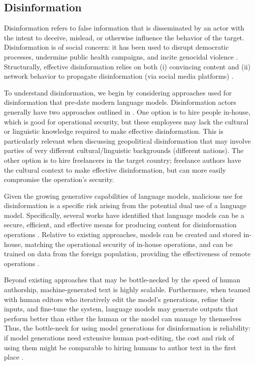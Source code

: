 \hypertarget{disinformation}{\subsection{Disinformation}}
Disinformation refers to false information that is disseminated by an actor with the intent to deceive, mislead, or otherwise influence the behavior of the target.
Disinformation is of social concern: it has been used to disrupt democratic processes, undermine public health campaigns, and incite genocidal violence \citep{election2021long, zarocostas2020fight, whitten2020poison}. 
Structurally, effective disinformation relies on both (i) convincing content and (ii) network behavior to propagate disinformation (\eg via social media platforms) \citep{benkler2018network}. 

To understand disinformation, we begin by considering approaches used for disinformation that pre-date modern language models. 
Disinformation actors generally have two approaches outlined in \citet{diresta2022house}.
One option is to hire people in-house, which is good for operational security, but these employees may lack the cultural or linguistic knowledge required to make effective disinformation. 
This is particularly relevant when discussing geopolitical disinformation that may involve parties of very different cultural/linguistic backgrounds (\eg different nations). 
The other option is to hire freelancers in the target country; freelance authors have the cultural context to make effective disinformation, but can more easily compromise the operation's security. 

Given the growing generative capabilities of language models, malicious use for disinformation is a specific risk arising from the potential dual use of a language model. 
Specifically, several works have identified that language models can be a secure, efficient, and effective means for producing content for disinformation operations \citep[][\S5.2]{radford2019language, buchanan2021truth, bommasani2021opportunities}.
Relative to existing approaches, models can be created and stored in-house, matching the operational security of in-house operations, and can be trained on data from the foreign population, providing the effectiveness of remote operations \citep[see][]{horvitz2022horizon}.

Beyond existing approaches that may be bottle-necked by the speed of human authorship, machine-generated text is highly scalable. Furthermore, when teamed with human editors who iteratively edit the model’s generations, refine their inputs, and fine-tune the system, language models may generate outputs that perform better than either the human or the model can manage by themselves \citep{buchanan2021truth} Thus, the bottle-neck for using model generations for disinformation is reliability: if model generations need extensive human post-editing, the cost and risk of using them might be comparable to hiring humans to author text in the first place \citep{goldstein2022generative}.

